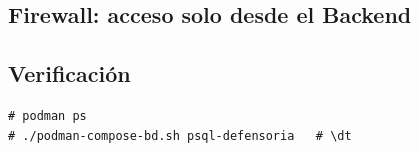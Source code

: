 \subsection{Firewall: acceso solo desde el Backend}

\subsection{Verificación}
\begin{lstlisting}
# podman ps
# ./podman-compose-bd.sh psql-defensoria   # \dt
\end{lstlisting}
